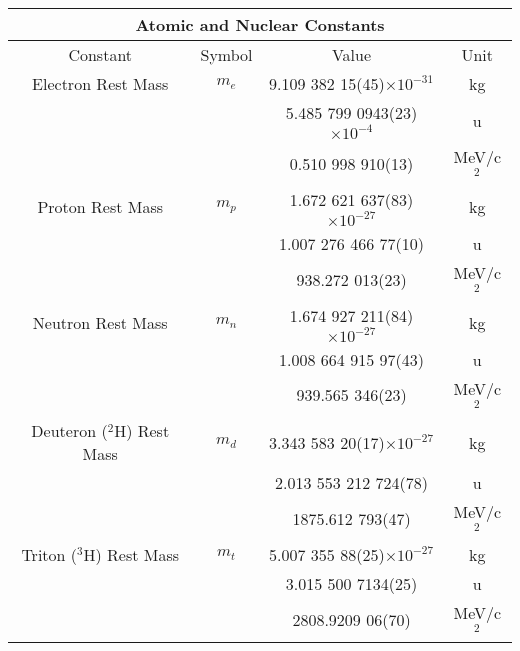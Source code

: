 \vfill
{}
\begin{table}[h]
  \centering
  \begin{tabular}{c c c c}
    \multicolumn{4}{c}{\Large Atomic and Nuclear Constants}\\
    \hline
    Constant \T\B& Symbol & Value & Unit \\
    \hline\hline
    Electron Rest Mass  \T  & $m_e$        & 9.109 382 15(45)$\times10^{-31}$    & kg \\
                            &              &  5.485 799 0943(23)$\times10^{-4}$  & u \\
                            &              & 0.510 998 910(13)                   & MeV/c$^2$ \\ [6pt]                    
    
    Proton Rest Mass        & $m_p$        & 1.672 621 637(83)$\times10^{-27}$  & kg \\
                            &              & 1.007 276 466 77(10)               & u \\
                            &              & 938.272 013(23)                    & MeV/c$^2$ \\[6pt] 
    
    Neutron Rest Mass       & $m_n$        & 1.674 927 211(84)$\times10^{-27}$   & kg \\
                            &              & 1.008 664 915 97(43)                & u \\
                            &              & 939.565 346(23)                     & MeV/c$^2$ \\[6pt]
    
    Deuteron ($^2$H) Rest Mass & $m_d$        & 3.343 583 20(17)$\times10^{-27}$  & kg \\
                               &              & 2.013 553 212 724(78)             & u\\
                               &              & 1875.612 793(47)                  & MeV/c$^2$ \\[6pt]
    
    Triton ($^3$H) Rest Mass   & $m_t$     & 5.007 355 88(25)$\times10^{-27}$  & kg \\
                               &           & 3.015 500 7134(25)                & u \\
                               &           & 2808.9209 06(70)                  & MeV/c$^2$ \\[6pt]
    

\end{tabular}
\end{table}
